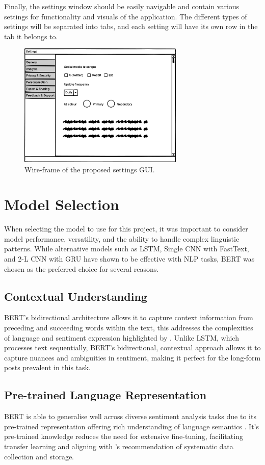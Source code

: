 Finally, the settings window should be easily navigable and contain various settings for functionality and visuals of the application. The different types of settings will be separated into tabs, and each setting will have its own row in the tab it belongs to.

\begin{figure}[h]
    \centering
    \includegraphics[width=0.7\textwidth]{figures/wireframe-settings.png}
    \caption{Wire-frame of the proposed settings GUI.}
\end{figure}

\section{Model Selection}
When selecting the model to use for this project, it was important to consider model performance, versatility, and the ability to handle complex linguistic patterns. While alternative models such as LSTM, Single CNN with FastText, and 2-L CNN with GRU have shown to be effective with NLP tasks, BERT was chosen as the preferred choice for several reasons.

    \subsection{Contextual Understanding}
    BERT's bidirectional architecture allows it to capture context information from preceding and succeeding words within the text, this addresses the complexities of language and sentiment expression highlighted by \citet{nasukawa2003sentiment, d2019sentiment}. Unlike LSTM, which processes text sequentially, BERT's bidirectional, contextual approach allows it to capture nuances and ambiguities in sentiment, making it perfect for the long-form posts prevalent in this task.

    \subsection{Pre-trained Language Representation}
    BERT is able to generalise well across diverse sentiment analysis tasks due to its pre-trained representation offering rich understanding of language semantics \citep{dhola2021comparative, rangila2022sentiment}. It's pre-trained knowledge reduces the need for extensive fine-tuning, facilitating transfer learning and aligning with \citet{malic2019social}'s recommendation of systematic data collection and storage.

